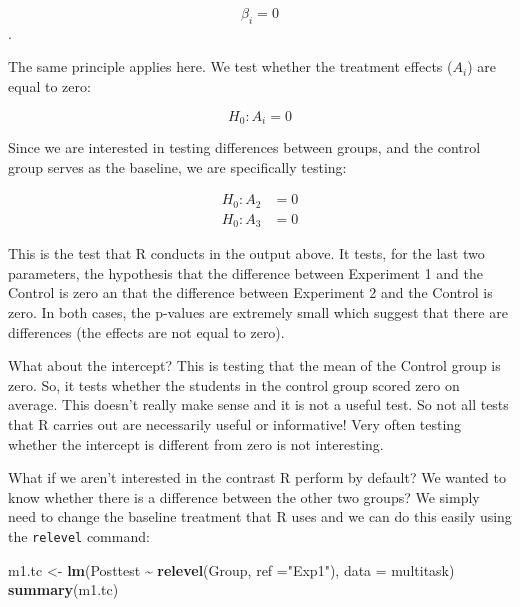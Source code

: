 \documentclass[
  letterpaper,
]{book}
\newenvironment{Shaded}{\begin{snugshade}}{\end{snugshade}}
\newcommand{\AttributeTok}[1]{\textcolor[rgb]{0.13,0.29,0.53}{#1}}
\newcommand{\FunctionTok}[1]{\textcolor[rgb]{0.13,0.29,0.53}{\textbf{#1}}}
\newcommand{\NormalTok}[1]{#1}
\newcommand{\OtherTok}[1]{\textcolor[rgb]{0.56,0.35,0.01}{#1}}
\newcommand{\SpecialCharTok}[1]{\textcolor[rgb]{0.81,0.36,0.00}{\textbf{#1}}}
\newcommand{\StringTok}[1]{\textcolor[rgb]{0.31,0.60,0.02}{#1}}
\begin{document}
\[\beta_i = 0\].

The same principle applies here. We test whether the treatment effects
(\(A_i\)) are equal to zero:

\[H_0: A_i = 0\]

Since we are interested in testing differences between groups, and the
control group serves as the baseline, we are specifically testing:

\[
\begin{aligned}
H_0: A_2 &= 0 \\ 
H_0: A_3 &= 0
\end{aligned}
\]

This is the test that R conducts in the output above. It tests, for the
last two parameters, the hypothesis that the difference between
Experiment 1 and the Control is zero an that the difference between
Experiment 2 and the Control is zero. In both cases, the p-values are
extremely small which suggest that there are differences (the effects
are not equal to zero).

What about the intercept? This is testing that the mean of the Control
group is zero. So, it tests whether the students in the control group
scored zero on average. This doesn't really make sense and it is not a
useful test. So not all tests that R carries out are necessarily useful
or informative! Very often testing whether the intercept is different
from zero is not interesting.

What if we aren't interested in the contrast R perform by default? We
wanted to know whether there is a difference between the other two
groups? We simply need to change the baseline treatment that R uses and
we can do this easily using the \texttt{relevel} command:

\begin{Shaded}
\begin{Highlighting}[]
\NormalTok{m1.tc }\OtherTok{\textless{}{-}} \FunctionTok{lm}\NormalTok{(Posttest }\SpecialCharTok{\textasciitilde{}} \FunctionTok{relevel}\NormalTok{(Group, }\AttributeTok{ref =}\StringTok{"Exp1"}\NormalTok{), }\AttributeTok{data =}\NormalTok{ multitask)}
\FunctionTok{summary}\NormalTok{(m1.tc)}
\end{Highlighting}
\end{Shaded}
\end{document}
